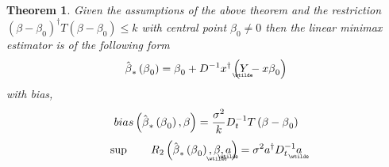 \documentclass{article}
\newtheorem{theorem}{Theorem}
\begin{document}
\begin{theorem}
Given the assumptions of the above theorem and the restriction $\left( \beta
-\beta _{0}\right) ^{\dagger }T\left( \beta -\beta _{0}\right) \leq k$ with
central point $\beta _{0}\neq 0$ then the linear minimax estimator is of the
following form%
\begin{equation*}
\hat{\beta}_{\ast }\left( \beta _{0}\right) =\beta _{0}+D^{-1}x^{\dagger
}\left( 
\underaccent{\wtilde}{Y}%
-x\beta _{0}\right)
\end{equation*}%
with bias,%
\begin{equation*}
bias\left( \hat{\beta}_{\ast }\left( \beta _{0}\right) ,\beta \right) =\frac{%
\sigma ^{2}}{k}D_{t}^{-1}T\left( \beta -\beta _{0}\right)
\end{equation*}%
\begin{equation*}
\sup \qquad R_{2}\left( \hat{\beta}_{\ast }\left( \beta _{0}\right) ,%
\underaccent{\wtilde}{\beta}%
,%
\underaccent{\wtilde}{a}%
\right) =\sigma ^{2}a^{\dagger }D_{t}^{-1}%
\underaccent{\wtilde}{a}%
\end{equation*}
\end{theorem}

\bigskip
\end{document}
